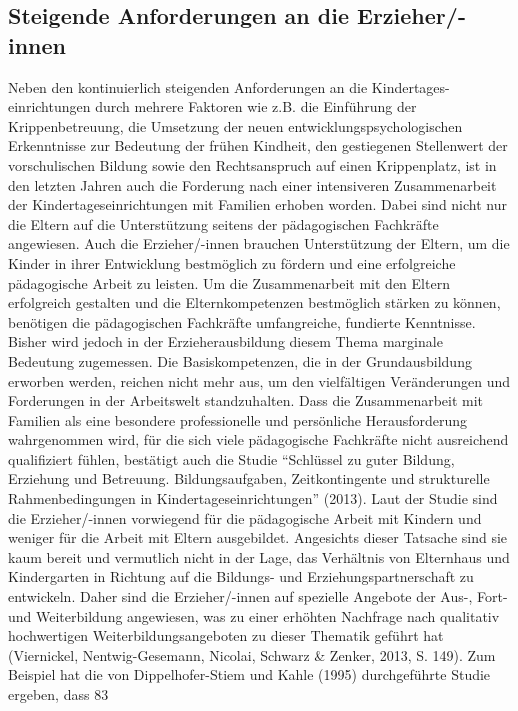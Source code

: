 \documentclass[12pt,a4paper]{article}
\begin{document}
\subsection{Steigende Anforderungen an die Erzieher/-innen} 
Neben den kontinuierlich steigenden Anforderungen an die Kindertages-einrichtungen durch mehrere Faktoren wie z.B. die Einführung der Krippenbetreuung, die Umsetzung der neuen entwicklungspsychologischen Erkenntnisse zur Bedeutung der frühen Kindheit, den gestiegenen Stellenwert der vorschulischen Bildung sowie den Rechtsanspruch auf einen Krippenplatz, ist in den letzten Jahren auch die Forderung nach einer intensiveren Zusammenarbeit der Kindertageseinrichtungen mit Familien erhoben worden. Dabei sind nicht nur die Eltern auf die Unterstützung seitens der pädagogischen Fachkräfte angewiesen. Auch die Erzieher/-innen brauchen Unterstützung der Eltern, um die Kinder in ihrer Entwicklung bestmöglich zu fördern und eine erfolgreiche pädagogische Arbeit zu leisten. 
Um die Zusammenarbeit mit den Eltern erfolgreich gestalten und die Elternkompetenzen bestmöglich stärken zu können, benötigen die pädagogischen Fachkräfte umfangreiche, fundierte Kenntnisse. Bisher wird jedoch in der Erzieherausbildung diesem Thema marginale Bedeutung zugemessen. Die Basiskompetenzen, die in der Grundausbildung erworben werden, reichen nicht mehr aus, um den vielfältigen Veränderungen und Forderungen in der Arbeitswelt standzuhalten. Dass die Zusammenarbeit mit Familien als eine besondere professionelle und persönliche Herausforderung wahrgenommen wird, für die sich viele pädagogische Fachkräfte nicht ausreichend qualifiziert fühlen, bestätigt auch die Studie "`Schlüssel zu guter Bildung, Erziehung und Betreuung. Bildungsaufgaben, Zeitkontingente und strukturelle Rahmenbedingungen in Kindertageseinrichtungen"' (2013). Laut der Studie sind die Erzieher/-innen vorwiegend für die pädagogische Arbeit mit Kindern und weniger für die Arbeit mit Eltern ausgebildet. Angesichts dieser Tatsache sind sie kaum bereit und vermutlich nicht in der Lage, das Verhältnis von Elternhaus und Kindergarten in Richtung auf die Bildungs- und Erziehungspartnerschaft zu entwickeln. Daher sind die Erzieher/-innen auf spezielle Angebote der Aus-, Fort- und Weiterbildung angewiesen, was zu einer erhöhten Nachfrage nach qualitativ hochwertigen Weiterbildungsangeboten zu dieser Thematik geführt hat (Viernickel, Nentwig-Gesemann, Nicolai, Schwarz \& Zenker, 2013, S. 149). 
Zum Beispiel hat die von Dippelhofer-Stiem und Kahle (1995) durchgeführte Studie ergeben, dass 83%
\end{document}
